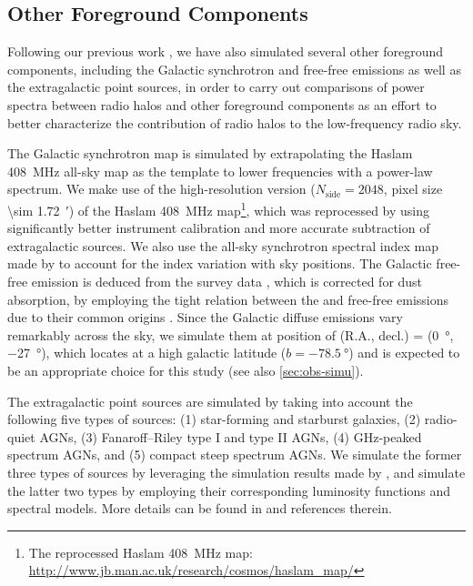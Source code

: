 \documentclass[twocolumn]{aastex62}
\newcommand{\R}[1]{\mathrm{#1}}
\newcommand{\Halpha}{\text{H$\alpha$}}
\begin{document}
\subsection{Other Foreground Components}
\label{sec:fg-other}

Following our previous work \citep{wang2010}, we have also simulated
several other foreground components, including the Galactic synchrotron
and free-free emissions as well as the extragalactic point sources,
in order to carry out comparisons of power spectra between radio halos
and other foreground components as an effort to better characterize the
contribution of radio halos to the low-frequency radio sky.

The Galactic synchrotron map is simulated by extrapolating the
Haslam \SI{408}{\MHz} all-sky map as the template to lower frequencies
with a power-law spectrum.
We make use of the high-resolution version ($N_{\R{side}} = 2048$,
pixel size \SI{\sim 1.72}{\arcminute}) of the Haslam \SI{408}{\MHz}
map\footnote{The reprocessed Haslam \SI{408}{\MHz} map:
  \url{http://www.jb.man.ac.uk/research/cosmos/haslam_map/}},
which was reprocessed by \citet{remazeilles2015} using significantly
better instrument calibration and more accurate subtraction of
extragalactic sources.
We also use the all-sky synchrotron spectral index map made by
\citet{giardino2002} to account for the index variation with sky positions.
The Galactic free-free emission is deduced from the \Halpha{} survey
data \citep{finkbeiner2003}, which is corrected for dust absorption,
by employing the tight relation between the \Halpha{} and free-free
emissions due to their common origins
\citep[see][and references therein]{dickinson2003}.
Since the Galactic diffuse emissions vary remarkably across the sky,
we simulate them at position of
(R.A., decl.\@) = (\SI{0}{\degree}, \SI{-27}{\degree}), which locates at a
high galactic latitude ($b = \SI{-78.5}{\degree}$) and is expected to be
an appropriate choice for this study (see also \autoref{sec:obs-simu}).

The extragalactic point sources are simulated by taking into account the
following five types of sources: (1) star-forming and starburst galaxies,
(2) radio-quiet AGNs, (3) Fanaroff--Riley type I and type II AGNs,
(4) GHz-peaked spectrum AGNs, and (5) compact steep spectrum AGNs.
We simulate the former three types of sources by leveraging the simulation
results made by \citet{wilman2008}, and simulate the latter two types
by employing their corresponding luminosity functions and spectral models.
More details can be found in \citet{wang2010} and references therein.
\end{document}

